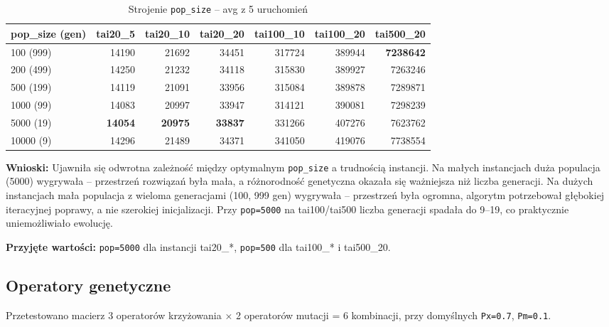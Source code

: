\documentclass[11pt,a4paper]{article}
\begin{document}
\begin{table}[H]
\centering
\caption{Strojenie \texttt{pop\_size} -- avg z 5 uruchomień}
\begin{tabular}{lrrrrrr}
\toprule
pop\_size (gen) & tai20\_5 & tai20\_10 & tai20\_20 & tai100\_10 & tai100\_20 & tai500\_20 \\
\midrule
100 (999)    & 14190 & 21692 & 34451 & 317724 & 389944 & \textbf{7238642} \\
200 (499)    & 14250 & 21232 & 34118 & 315830 & 389927 & 7263246 \\
500 (199)    & 14119 & 21091 & 33956 & 315084 & 389878 & 7289871 \\
1000 (99)    & 14083 & 20997 & 33947 & 314121 & 390081 & 7298239 \\
5000 (19)    & \textbf{14054} & \textbf{20975} & \textbf{33837} & 331266 & 407276 & 7623762 \\
10000 (9)    & 14296 & 21489 & 34371 & 341050 & 419076 & 7738554 \\
\bottomrule
\end{tabular}
\end{table}

\textbf{Wnioski:} Ujawniła się odwrotna zależność między optymalnym \texttt{pop\_size} a trudnością instancji. Na małych instancjach duża populacja (5000) wygrywała -- przestrzeń rozwiązań była mała, a różnorodność genetyczna okazała się ważniejsza niż liczba generacji. Na dużych instancjach mała populacja z wieloma generacjami (100, 999 gen) wygrywała -- przestrzeń była ogromna, algorytm potrzebował głębokiej iteracyjnej poprawy, a nie szerokiej inicjalizacji. Przy \texttt{pop=5000} na tai100/tai500 liczba generacji spadała do 9--19, co praktycznie uniemożliwiało ewolucję.

\textbf{Przyjęte wartości:} \texttt{pop=5000} dla instancji tai20\_*, \texttt{pop=500} dla tai100\_* i tai500\_20.

\subsection{Operatory genetyczne}

Przetestowano macierz 3 operatorów krzyżowania × 2 operatorów mutacji = 6 kombinacji, przy domyślnych \texttt{Px=0.7}, \texttt{Pm=0.1}.
\end{document}
